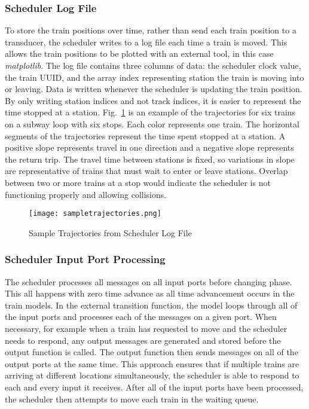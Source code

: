 \subsubsection{Scheduler Log File}
To store the train positions over time, rather than send each train position to a transducer, the scheduler writes to a log file each time a train is moved. This allows the train positions to be plotted with an external tool, in this case \textit{matplotlib}.  The log file contains three columns of data: the scheduler clock value, the train UUID, and the array index representing station the train is moving into or leaving.  Data is written whenever the scheduler is updating the train position.  By only writing station indices and not track indices, it is easier to represent the time stopped at a station.  Fig.~\ref{fig:sampletrajectories} is an example of the trajectories for six trains on a subway loop with six stops.  Each color represents one train.  The horizontal segments of the trajectories represent the time spent stopped at a station. A positive slope represents travel in one direction and a negative slope represents the return trip. The travel time between stations is fixed, so variations in slope are representative of trains that must wait to enter or leave stations.  Overlap between two or more trains at a stop would indicate the scheduler is not functioning properly and allowing collisions.   
%
\begin{figure}[htb]
	\centering
	\texttt{[image: sampletrajectories.png]}
	\caption{Sample Trajectories from Scheduler Log File}
	\label{fig:sampletrajectories}
\end{figure}

\subsubsection{Scheduler Input Port Processing}
The scheduler processes all messages on all input ports before changing phase.  This all happens with zero time advance as all time advancement occurs in the train models.  In the external transition function, the model loops through all of the input ports and processes each of the messages on a given port.  When necessary, for example when a train has requested to move and the scheduler needs to respond, any output messages are generated and stored before the output function is called.  The output function then sends messages on all of the output ports at the same time.  This approach ensures that if multiple trains are arriving at different locations simultaneously, the scheduler is able to respond to each and every input it receives.  After all of the input ports have been processed, the scheduler then attempts to move each train in the waiting queue.

